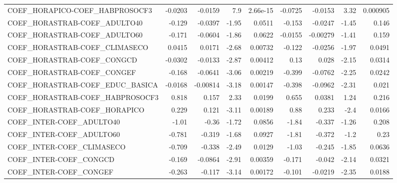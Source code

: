 \begin{tabular}{lrrrrrrrr}
COEF\_HORAPICO-COEF\_HABPROSOCF3       &     -0.0203 &      -0.0159 &     7.9 & 2.66e-15 &    -0.0725 &     -0.0153 &         3.32 &      0.000905 \\
COEF\_HORASTRAB-COEF\_ADULTO40         &      -0.129 &      -0.0397 &   -1.95 &   0.0511 &     -0.153 &     -0.0247 &        -1.45 &         0.146 \\
COEF\_HORASTRAB-COEF\_ADULTO60         &      -0.171 &      -0.0604 &   -1.86 &   0.0622 &    -0.0155 &    -0.00279 &        -1.41 &         0.159 \\
COEF\_HORASTRAB-COEF\_CLIMASECO        &      0.0415 &       0.0171 &   -2.68 &  0.00732 &     -0.122 &     -0.0256 &        -1.97 &        0.0491 \\
COEF\_HORASTRAB-COEF\_CONGCD           &     -0.0302 &      -0.0133 &   -2.87 &  0.00412 &       0.13 &       0.028 &        -2.15 &        0.0314 \\
COEF\_HORASTRAB-COEF\_CONGEF           &      -0.168 &      -0.0641 &   -3.06 &  0.00219 &     -0.399 &     -0.0762 &        -2.25 &        0.0242 \\
COEF\_HORASTRAB-COEF\_EDUC\_BASICA      &     -0.0168 &     -0.00814 &   -3.18 &  0.00147 &     -0.398 &     -0.0962 &        -2.31 &         0.021 \\
COEF\_HORASTRAB-COEF\_HABPROSOCF3      &       0.818 &        0.157 &    2.33 &   0.0199 &      0.655 &      0.0381 &         1.24 &         0.216 \\
COEF\_HORASTRAB-COEF\_HORAPICO         &       0.229 &        0.121 &   -3.11 &  0.00189 &       0.88 &       0.233 &         -2.4 &        0.0166 \\
COEF\_INTER-COEF\_ADULTO40             &       -1.01 &        -0.36 &   -1.72 &   0.0856 &      -1.84 &      -0.337 &        -1.26 &         0.208 \\
COEF\_INTER-COEF\_ADULTO60             &      -0.781 &       -0.319 &   -1.68 &   0.0927 &      -1.81 &      -0.372 &         -1.2 &          0.23 \\
COEF\_INTER-COEF\_CLIMASECO            &      -0.709 &       -0.338 &   -2.49 &   0.0129 &      -1.03 &      -0.245 &        -1.85 &        0.0636 \\
COEF\_INTER-COEF\_CONGCD               &      -0.169 &      -0.0864 &   -2.91 &  0.00359 &     -0.171 &      -0.042 &        -2.14 &        0.0321 \\
COEF\_INTER-COEF\_CONGEF               &      -0.263 &       -0.117 &   -3.14 &  0.00172 &     -0.101 &     -0.0219 &        -2.35 &        0.0188 \\

\end{tabular}
